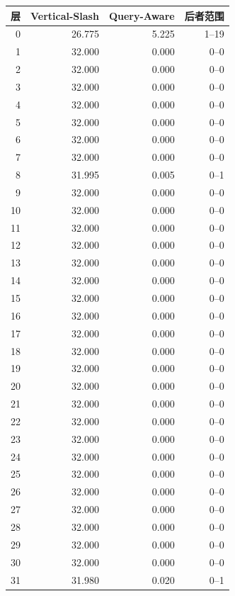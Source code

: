 \documentclass[11pt,a4paper]{article}
\newcommand{\zh}[1]{{\CJKfont #1}}
\renewcommand{\arraystretch}{1.12}
\begin{document}
\begin{center}
\renewcommand{\arraystretch}{1.02}
\begin{tabular}{@{}rrrr@{}}
\toprule
\textbf{\zh{层}} & \textbf{Vertical-Slash} & \textbf{Query-Aware} & \textbf{\zh{后者范围}} \\
\midrule
0 & 26.775 & 5.225 & 1--19 \\
1 & 32.000 & 0.000 & 0--0 \\
2 & 32.000 & 0.000 & 0--0 \\
3 & 32.000 & 0.000 & 0--0 \\
4 & 32.000 & 0.000 & 0--0 \\
5 & 32.000 & 0.000 & 0--0 \\
6 & 32.000 & 0.000 & 0--0 \\
7 & 32.000 & 0.000 & 0--0 \\
8 & 31.995 & 0.005 & 0--1 \\
9 & 32.000 & 0.000 & 0--0 \\
10 & 32.000 & 0.000 & 0--0 \\
11 & 32.000 & 0.000 & 0--0 \\
12 & 32.000 & 0.000 & 0--0 \\
13 & 32.000 & 0.000 & 0--0 \\
14 & 32.000 & 0.000 & 0--0 \\
15 & 32.000 & 0.000 & 0--0 \\
16 & 32.000 & 0.000 & 0--0 \\
17 & 32.000 & 0.000 & 0--0 \\
18 & 32.000 & 0.000 & 0--0 \\
19 & 32.000 & 0.000 & 0--0 \\
20 & 32.000 & 0.000 & 0--0 \\
21 & 32.000 & 0.000 & 0--0 \\
22 & 32.000 & 0.000 & 0--0 \\
23 & 32.000 & 0.000 & 0--0 \\
24 & 32.000 & 0.000 & 0--0 \\
25 & 32.000 & 0.000 & 0--0 \\
26 & 32.000 & 0.000 & 0--0 \\
27 & 32.000 & 0.000 & 0--0 \\
28 & 32.000 & 0.000 & 0--0 \\
29 & 32.000 & 0.000 & 0--0 \\
30 & 32.000 & 0.000 & 0--0 \\
31 & 31.980 & 0.020 & 0--1 \\
\bottomrule
\end{tabular}
\end{center}
\end{document}
